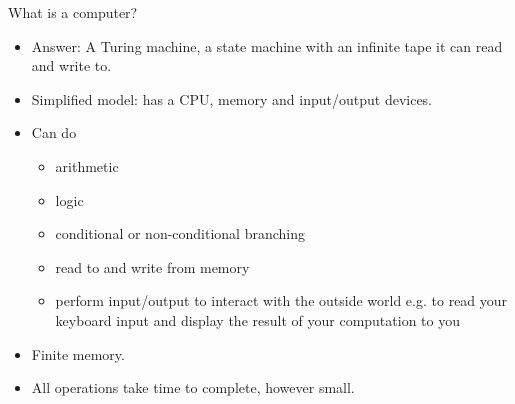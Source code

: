 \documentclass{beamer}
\begin{document}



\begin{frame}{What is a computer?}
\begin{itemize}
\item Answer: A Turing machine, a state machine with an infinite tape it can read and write to.
\item Simplified model: has a CPU, memory and input/output devices.
\item Can do
\begin{itemize}
\item arithmetic
\item logic
\item conditional or non-conditional branching
\item read to and write from memory
\item perform input/output to interact with the outside world e.g. to read your keyboard input and display 
			the result of your computation to you
\end{itemize}
\item Finite memory.
\item All operations take time to complete, however small.
\end{itemize}
\end{frame}
\end{document}
